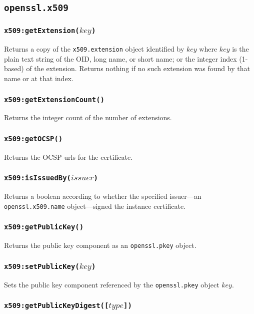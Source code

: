 \documentclass[11pt, oneside]{memoir}
\newcommand*{\fn}[1]{\texttt{#1}\xspace}
\newcommand*{\module}[1]{\texttt{#1}\xspace}
\newcounter{toccols}
\newenvironment{Module}[1]{
	\subsection{\texttt{#1}}
	\addtocontents{toc}{
		\protect\begin{multicols}{\value{toccols}}
	}
}{
	\addtocontents{toc}{\protect\end{multicols}}
}
\begin{document}
\begin{Module}{openssl.x509}
\subsubsection[\fn{x509:getExtension}]{\fn{x509:getExtension($key$)}}

Returns a copy of the \module{x509.extension} object identified by $key$ where $key$ is the plain text string of the OID, long name, or short name; or the integer index (1-based) of the extension. Returns nothing if no such extension was found by that name or at that index.

\subsubsection[\fn{x509:getExtensionCount}]{\fn{x509:getExtensionCount()}}

Returns the integer count of the number of extensions.

\subsubsection[\fn{x509:getOCSP}]{\fn{x509:getOCSP()}}

Returns the OCSP urls for the certificate.

\subsubsection[\fn{x509:isIssuedBy}]{\fn{x509:isIssuedBy($issuer$)}}

Returns a boolean according to whether the specified issuer---an \module{openssl.x509.name} object---signed the instance certificate.

\subsubsection[\fn{x509:getPublicKey}]{\fn{x509:getPublicKey()}}

Returns the public key component as an \module{openssl.pkey} object.

\subsubsection[\fn{x509:setPublicKey}]{\fn{x509:setPublicKey($key$)}}

Sets the public key component referenced by the \module{openssl.pkey} object $key$.

\subsubsection[\fn{x509:getPublicKeyDigest}]{\fn{x509:getPublicKeyDigest([$type$])}}


\end{Module}
\end{document}
